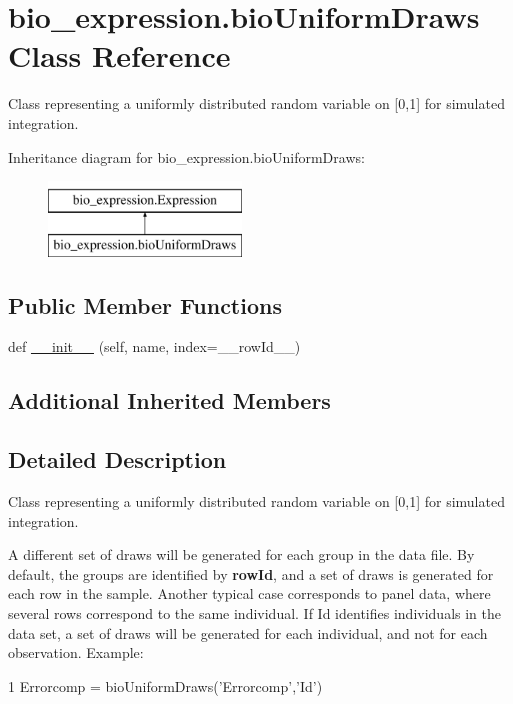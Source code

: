 \hypertarget{classbio__expression_1_1bio_uniform_draws}{}\section{bio\+\_\+expression.\+bio\+Uniform\+Draws Class Reference}
\label{classbio__expression_1_1bio_uniform_draws}


Class representing a uniformly distributed random variable on \mbox{[}0,1\mbox{]} for simulated integration.  


Inheritance diagram for bio\+\_\+expression.\+bio\+Uniform\+Draws\+:\begin{figure}[H]
\begin{center}
\leavevmode
\includegraphics[height=2.000000cm]{classbio__expression_1_1bio_uniform_draws}
\end{center}
\end{figure}
\subsection*{Public Member Functions}
\begin{DoxyCompactItemize}
\item 
def \hyperlink{classbio__expression_1_1bio_uniform_draws_a132717324d8d03e3233a4798629bdf32}{\+\_\+\+\_\+init\+\_\+\+\_\+} (self, name, index=\textquotesingle{}\+\_\+\+\_\+row\+Id\+\_\+\+\_\+\textquotesingle{})
\end{DoxyCompactItemize}
\subsection*{Additional Inherited Members}


\subsection{Detailed Description}
Class representing a uniformly distributed random variable on \mbox{[}0,1\mbox{]} for simulated integration. 

A different set of draws will be generated for each group in the data file. By default, the groups are identified by {\bfseries row\+Id}, and a set of draws is generated for each row in the sample. Another typical case corresponds to panel data, where several rows correspond to the same individual. If Id identifies individuals in the data set, a set of draws will be generated for each individual, and not for each observation. Example\+: 
\begin{DoxyCode}
1 Errorcomp = bioUniformDraws(\textcolor{stringliteral}{'Errorcomp'},\textcolor{stringliteral}{'Id'})
\end{DoxyCode}
 

